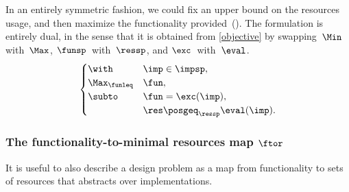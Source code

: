 \begin{rem}
In an entirely symmetric fashion, we could fix an upper bound on
the resources usage, and then maximize the functionality provided~().
The formulation is entirely dual, in the sense that it is obtained
from \eqref{objective} by swapping~$\Min$ with~$\Max$, $\funsp$~with~$\ressp$,
and $\exc$~with~$\eval$.
\begin{equation}
\begin{cases}
\with & \imp\in\impsp,\\
\Max_{\funleq} & \fun,\\
\subto & \fun=\exc(\imp),\\
 & \res\posgeq_{\ressp}\eval(\imp).
\end{cases}\label{eq:objective-1}
\end{equation}
\end{rem}



\subsubsection{The functionality-to-minimal resources map $\ftor$}

It is useful to also describe a design problem as a map from functionality
to sets of resources that abstracts over implementations. 

